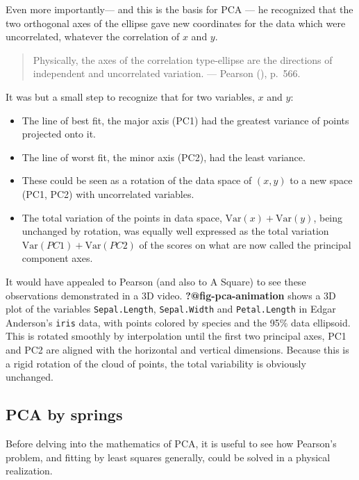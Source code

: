 \documentclass[
  letterpaper,
  10pt,
  krantz2]{krantz}
\providecommand{\tightlist}{%
  \setlength{\itemsep}{0pt}\setlength{\parskip}{0pt}}\usepackage{longtable,booktabs,array}
\begin{document}
Even more importantly--- and this is the basis for PCA --- he recognized
that the two orthogonal axes of the ellipse gave new coordinates for the
data which were uncorrelated, whatever the correlation of \(x\) and
\(y\).

\begin{quote}
Physically, the axes of the correlation type-ellipse are the directions
of independent and uncorrelated variation. --- Pearson
(), p.~566.
\end{quote}

It was but a small step to recognize that for two variables, \(x\) and
\(y\):

\begin{itemize}
\tightlist
\item
  The line of best fit, the major axis (PC1) had the greatest variance
  of points projected onto it.
\item
  The line of worst fit, the minor axis (PC2), had the least variance.
\item
  These could be seen as a rotation of the data space of \((x, y)\) to a
  new space (PC1, PC2) with uncorrelated variables.
\item
  The total variation of the points in data space,
  \(\text{Var}(x) + \text{Var}(y)\), being unchanged by rotation, was
  equally well expressed as the total variation
  \(\text{Var}(PC1) + \text{Var}(PC2)\) of the scores on what are now
  called the principal component axes.
\end{itemize}

It would have appealed to Pearson (and also to A Square) to see these
observations demonstrated in a 3D video. \textbf{?@fig-pca-animation}
shows a 3D plot of the variables \texttt{Sepal.Length},
\texttt{Sepal.Width} and \texttt{Petal.Length} in Edgar Anderson's
\texttt{iris} data, with points colored by species and the 95\% data
ellipsoid. This is rotated smoothly by interpolation until the first two
principal axes, PC1 and PC2 are aligned with the horizontal and vertical
dimensions. Because this is a rigid rotation of the cloud of points, the
total variability is obviously unchanged.

\subsection{PCA by springs}\label{pca-by-springs}

Before delving into the mathematics of PCA, it is useful to see how
Pearson's problem, and fitting by least squares generally, could be
solved in a physical realization.
\end{document}
